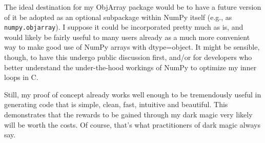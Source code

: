 \documentclass[letterpaper,compsoc,twoside]{IEEEtran}
\begin{document}
The ideal destination for my ObjArray package would be to have a future version of it be adopted as an optional subpackage within NumPy itself (e.g., as \texttt{numpy.objarray}).  I suppose it could be incorporated pretty much as is, and would likely be fairly useful to many users already as a much more convenient way to make good use of NumPy arrays with dtype=object.  It might be sensible, though, to have this undergo public discussion first, and/or for developers who better understand the under-the-hood workings of NumPy to optimize my inner loops in C.

Still, my proof of concept already works well enough to be tremendously useful in generating code that is simple, clean, fast, intuitive and beautiful.  This demonstrates that the rewards to be gained through my \textquotedbl{}dark magic\textquotedbl{} very likely will be worth the costs.  Of course, that's what practitioners of dark magic always say.
\end{document}
